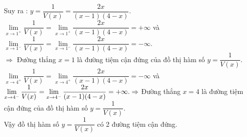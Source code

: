 \begin{ex}
{		Suy ra : $y=\dfrac{1}{V(x)}=\dfrac{2 x}{(x-1)(4-x)}$.\\
		$\lim\limits _{x \rightarrow 1^{+}} \dfrac{1}{V(x)}=\lim\limits _{x \rightarrow 1^{+}} \dfrac{2 x}{(x-1)(4-x)}=+\infty$ và $\lim\limits _{x \rightarrow 1^{-}} \dfrac{1}{V(x)}=\lim\limits _{x \rightarrow 1^{-}} \dfrac{2 x}{(x-1)(4-x)}=-\infty$.\\
		$ \Rightarrow$ Đường thẳng $x=1$ là đường tiệm cận đứng của đồ thị hàm số $y=\dfrac{1}{V(x)}$.\\ 
		$\lim\limits _{x \rightarrow 4^{+}} \dfrac{1}{V(x)}=\lim\limits _{x \rightarrow 4^{+}} \dfrac{2 x}{(x-1)(4-x)}=-\infty$ và $\lim\limits _{x \rightarrow 4^{-}} \dfrac{1}{V(x)}=\lim\limits _{x \rightarrow 4^{-}} \dfrac{2 x}{(x-1)(4-x)}=+\infty.\\ \Rightarrow$ Đường thẳng $x=4$ là đường tiệm cận đứng của đồ thị hàm số $y=\dfrac{1}{V(x)}$.\\
		Vậy đồ thị hàm số $y=\dfrac{1}{V(x)}$ có 2 đường tiệm cận đứng.
	}
\end{ex}

